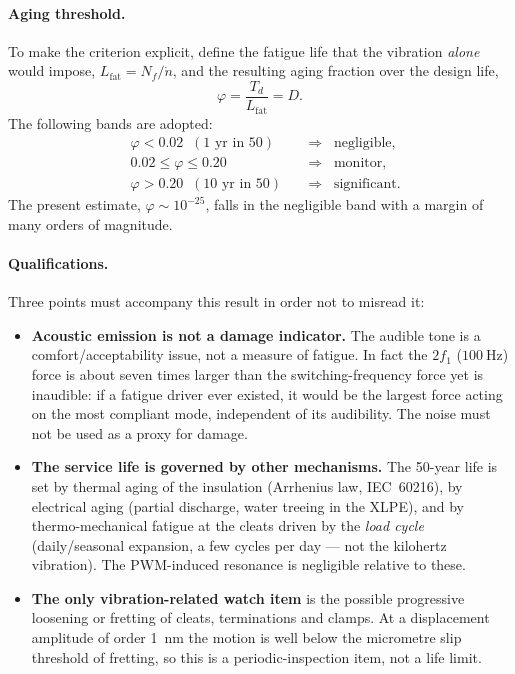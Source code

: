 \paragraph{Aging threshold.}
To make the criterion explicit, define the fatigue life that the vibration
\emph{alone} would impose, $L_{\mathrm{fat}}=N_f/\dot n$, and the resulting aging
fraction over the design life,
\begin{equation}
	\varphi = \frac{T_d}{L_{\mathrm{fat}}} = D.
\end{equation}
The following bands are adopted:
\begin{equation}
	\boxed{\;
	\begin{aligned}
	&\varphi < 0.02 \;\;(\text{1 yr in 50}) && \Rightarrow\;\; \text{negligible},\\
	&0.02 \le \varphi \le 0.20 && \Rightarrow\;\; \text{monitor},\\
	&\varphi > 0.20 \;\;(\text{10 yr in 50}) && \Rightarrow\;\; \text{significant}.
	\end{aligned}
	\;}
\end{equation}
The present estimate, $\varphi\sim10^{-25}$, falls in the negligible band with a
margin of many orders of magnitude.

\paragraph{Qualifications.}
Three points must accompany this result in order not to misread it:
\begin{itemize}[leftmargin=*]
	\item[--] \textbf{Acoustic emission is not a damage indicator.} The audible tone
	is a comfort/acceptability issue, not a measure of fatigue. In fact the
	$2f_1$ ($\SI{100}{\hertz}$) force is about seven times larger than the
	switching-frequency force yet is inaudible: if a fatigue driver ever existed,
	it would be the largest force acting on the most compliant mode, independent of
	its audibility. The noise must not be used as a proxy for damage.
	\item[--] \textbf{The service life is governed by other mechanisms.} The
	\num{50}-year life is set by thermal aging of the insulation
	(Arrhenius law, IEC~60216), by electrical aging (partial discharge, water
	treeing in the XLPE), and by thermo-mechanical fatigue at the cleats driven by
	the \emph{load cycle} (daily/seasonal expansion, a few cycles per day --- not
	the kilohertz vibration). The PWM-induced resonance is negligible relative to
	these.
	\item[--] \textbf{The only vibration-related watch item} is the possible
	progressive loosening or fretting of cleats, terminations and clamps. At a
	displacement amplitude of order \SI{1}{\nano\meter} the motion is well below the
	micrometre slip threshold of fretting, so this is a periodic-inspection item,
	not a life limit.
\end{itemize}


